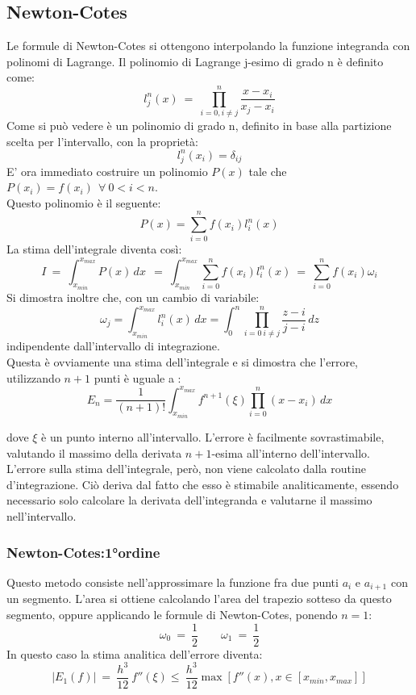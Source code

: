 \subsection{Newton-Cotes}
Le formule di Newton-Cotes si ottengono interpolando la funzione integranda con polinomi di Lagrange.
Il polinomio di Lagrange j-esimo di grado n è definito come:
$$
	l_j^n (x)\ = \ \prod_{i = 0, i \ne j}^{n} \frac{x-x_i}{x_j - x_i}
$$
	Come si può vedere è un polinomio di grado n, definito in base alla partizione scelta per l'intervallo, con la proprietà:
$$
	l_j^n ( x_i) = \delta_{ij}
$$
E' ora immediato costruire un polinomio $P(x)$ tale che $ P(x_i) = f(x_i) \ \ \forall \   0<i<n$.\\
Questo polinomio è il seguente:
$$
	P(x) = \sum_{i = 0}^n f(x_i) l_i^n(x)
$$
La stima dell'integrale diventa così:
$$
 I \ = \ \int_{x_{min}}^{x_{max}} P(x) \, dx \ \ = \ \int_{x_{min}}^{x_{max}} \sum_{i = 0}^n f(x_i) l_i^n(x)  \ =  \ \sum_{i = 0}^n f(x_i) \omega_i 
$$
 Si dimostra inoltre che, con un cambio di variabile:
 $$
 \omega_j = \int_{x_{min}}^{x_{max}} l_i^n(x) \,dx  = \int_{0}^{n} \prod_{i = 0 \ i \ne j}^n \frac{z-i}{j-i}\,dz 
$$
indipendente dall'intervallo di integrazione.\\
Questa è ovviamente una stima dell'integrale e si dimostra che l'errore, utilizzando $n+1$ punti è uguale a :
$$
 E_n = \frac{1}{(n+1)!} \int_{x_{min}}^{x_{max}} f^{n+1}(\xi) \prod_{i = 0}^n {(x-x_i)} \, dx 
 $$

 dove $\xi$ è un punto interno all'intervallo. L'errore è facilmente sovrastimabile, valutando il massimo della derivata $n+1$-esima all'interno dell'intervallo. L'errore sulla stima dell'integrale,
però, non viene calcolato dalla routine d'integrazione. Ciò deriva dal fatto che esso è stimabile analiticamente,
essendo necessario solo calcolare la derivata dell'integranda e valutarne il massimo nell'intervallo.

\subsubsection*{Newton-Cotes:1°ordine}
Questo metodo consiste nell'approssimare la funzione fra due punti $a_i$ e $a_{i+1}$ con un segmento.
L'area si ottiene calcolando l'area del trapezio sotteso da questo segmento, oppure applicando le formule di Newton-Cotes, ponendo $ n = 1$: 
$$
\omega_0 \ = \ \frac{1}{2} \qquad \omega_1 \ = \ \frac{1}{2}
$$
In questo caso la stima analitica dell'errore diventa:
$$
| E_1(f) |  \ = \ \frac{h^3}{12} \ f''(\xi) \leq \  \frac{h^3}{12} \max \left[ f''(x), x \in [x_{min},x_{max}] \right]
$$
